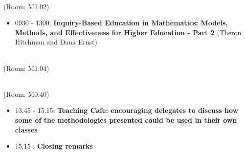 \documentclass[a4paper]{article}
\begin{document}
\begin{center}
    \\
    \tiny{(Room: M1.02)}
\end{center}

\begin{itemize}
    \item 0930 - 1300: \textbf{Inquiry-Based Education in Mathematics: Models, Methods, and Effectiveness for Higher Education - Part 2} (Theron Hitchman and Dana Ernst)
\end{itemize}

\vspace{1cm}

\begin{center}
    \\
    \tiny{(Room: M1.04)}
\end{center}

\vspace{1cm}

\begin{center}
    \\
    \tiny{(Room: M0.40)}
\end{center}

\begin{itemize}
    \item 13.45 - 15.15: \textbf{Teaching Cafe: encouraging delegates to discuss how some of the methodologies presented could be used in their own classes}
    \item 15.15 : \textbf{Closing remarks}
\end{itemize}
\end{document}
